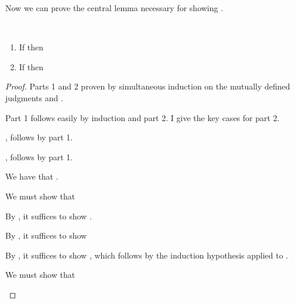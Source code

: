 Now we can prove the central lemma necessary for showing .
\begin{lemma}
  \label{lem:cc:type-pres}
  ~
  \begin{enumerate}
    \item If \im{\wf{\slenv}} then \im{\pccwf{\cctrans{\slenv}}}
    \item If \im{\styjudg{\slenv}{\se}{\sA}} then \im{\pcctyjudg{\cctrans{\slenv}}{\cctrans{\se}}{\cctrans{\sA}}}
  \end{enumerate}
\end{lemma}
\begin{proof}
  Parts 1 and 2 proven by simultaneous induction on the mutually defined judgments
    \im{\wf{\slenv}} and \im{\styjudg{\slenv}{\se}{\sA}}.

  Part 1 follows easily by induction and part 2.
  I give the key cases for part 2.

  \begin{proofcases}
    \item {}, follows by part 1.
    \item {}, follows by part 1.
    \item {}

    We have that \im{\styjudg{\slenv}{\spity{\sx}{\sA}{\sB}}{\sstarty}}.

    We must show that \im{\pcctyjudg{\pcclenv}{\pccnexistty{(\pccalpha:\pccstarty,\pccn:\pccalpha)}{\pcctrlufunty{\pccn}{\pcccodety{\pccx:\cctrans{\sA}}}{\cctrans{\sB}}}}{\pccstarty}}

    By , it suffices to show
    \im{\pcctyjudg{\pcclenv,\pccalpha:\pccstarty,\pccn:\pccalpha}{(\pcctrlufunty{\pccn}{\pcccodety{\pccx:\cctrans{\sA}}}{\cctrans{\sB}})}{\pccstarty}}.

    By , it suffices to show \im{\pcctyjudg{\pcclenv,\pccalpha:\pccstarty,\pccn:\pccalpha}{\pcccodety{\pccnpr:\pccalpha,\pccx:\cctrans{\sA}}{\cctrans{\sB}}}{\pccstarty}}

    By , it suffices to show
    \im{\pcctyjudg{\pcclenv,\pccalpha:\pccstarty,\pccn:\pccalpha,\pccnpr:\pccalpha,\pccx:\cctrans{\sA}}{\cctrans{\sB}}{\pccstarty}},
    which follows by the induction hypothesis applied to \im{\styjudg{\slenv,\sx:\sA}{\sB}{\sstarty}}.
    \item {}

    We must show that
    \im{\pcctyjudg{\pcclenv}{\cctrans{(\sfune{\sx}{\sA}{\se})}}{\cctrans{(\spity{\sx}{\sA}{\sB})}}}


\end{proofcases}
\end{proof}
